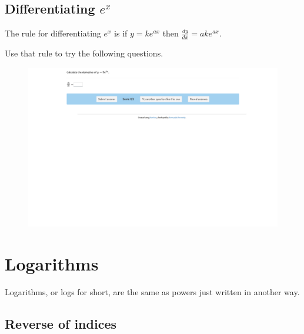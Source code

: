 \documentclass[
  a4paper,
]{scrbook}
\begin{document}
\hypertarget{differentiating-ex}{%
\section{\texorpdfstring{Differentiating
\(e^x\)}{Differentiating e\^{}x}}\label{differentiating-ex}}

The rule for differentiating \(e^x\) is if \(y = ke^{ax}\) then
\(\frac{dy}{dx}= ake^{ax}\).

Use that rule to try the following questions.

\begin{figure}

{\centering 

\href{https://numbas.mathcentre.ac.uk/question/62791/differentiation-using-a-table-of-derivatives-4/embed/?token=c0e0c050-43ee-44bf-ac18-9377c9d3a522}{\includegraphics{./10-exponetial_function_files/figure-pdf/unnamed-chunk-3-1.png}}

}

\end{figure}


\hypertarget{logarithms}{%
\chapter{Logarithms}\label{logarithms}}

Logarithms, or logs for short, are the same as powers just written in
another way.

\hypertarget{reverse-of-indices}{%
\section{Reverse of indices}\label{reverse-of-indices}}
\end{document}
